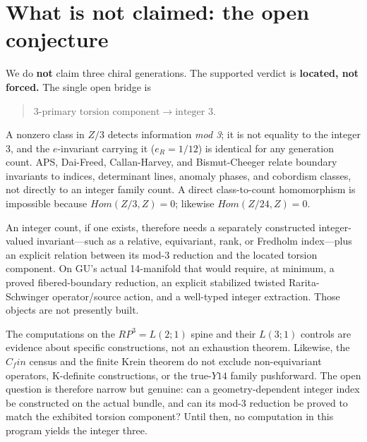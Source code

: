 \documentclass[11pt]{article}
\theoremstyle{remark}
\begin{document}
\section{What is not claimed: the open conjecture}
We do \textbf{not} claim three chiral generations. The supported verdict is \textbf{located, not forced.} The single open bridge is

\begin{quote}
$3\text{-primary torsion component}\to\text{integer }3$.
\end{quote}
A nonzero class in $Z/3$ detects information \emph{mod 3}; it is not equality to the integer 3, and the $e$-invariant carrying it ($e_R = 1/12$) is identical for any generation count. APS, Dai-Freed, Callan-Harvey, and Bismut-Cheeger relate boundary invariants to indices, determinant lines, anomaly phases, and cobordism classes, not directly to an integer family count. A direct class-to-count homomorphism is impossible because $Hom(Z/3, Z) = 0$; likewise $Hom(Z/24, Z) = 0$.

An integer count, if one exists, therefore needs a separately constructed integer-valued invariant---such as a relative, equivariant, rank, or Fredholm index---plus an explicit relation between its mod-3 reduction and the located torsion component. On GU's actual 14-manifold that would require, at minimum, a proved fibered-boundary reduction, an explicit stabilized twisted Rarita-Schwinger operator/source action, and a well-typed integer extraction. Those objects are not presently built.

The computations on the $RP^3 = L(2;1)$ spine and their $L(3;1)$ controls are evidence about specific constructions, not an exhaustion theorem. Likewise, the $C_fin$ census and the finite Krein theorem do not exclude non-equivariant operators, K-definite constructions, or the true-$Y14$ family pushforward. The open question is therefore narrow but genuine: can a geometry-dependent integer index be constructed on the actual bundle, and can its mod-3 reduction be proved to match the exhibited torsion component? Until then, no computation in this program yields the integer three.
\end{document}
